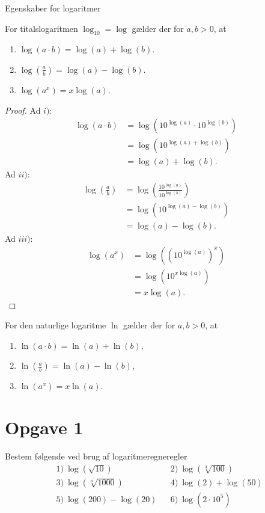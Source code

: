 \begin{center}
\Huge
Egenskaber for logaritmer
\end{center}

\begin{setn}
For titalslogaritmen $\log_{10} =\log$ gælder der for $a,b>0$, at 
\begin{enumerate}
\item $\log(a\cdot b) = \log(a) + \log(b)$. 
\item $\log\left(\frac{a}{b}\right) = \log(a)-\log(b)$.
\item $\log(a^x) = x\log(a)$.
\end{enumerate} 
\end{setn}
\begin{proof}
Ad $i)$:
\begin{align*}
\log(a\cdot b) &= \log(10^{\log(a)}\cdot 10^{\log(b)})\\
&= \log(10^{\log(a)+\log(b)})\\
&= \log(a)+\log(b).
\end{align*}
Ad $ii)$:
\begin{align*}
\log\left(\frac{a}{b}\right) &= \log \left(\frac{10^{\log(a)}}{10^{\log(b)}}\right)\\
&= \log(10^{\log(a)-\log(b)})\\
&= \log(a)-\log(b).
\end{align*}
Ad $iii)$:
\begin{align*}
\log(a^x) &= \log((10^{\log(a)})^x)\\
&= \log(10^{x\log(a)})\\
&= x\log(a).
\end{align*}
\end{proof}
\begin{setn}
For den naturlige logaritme $\ln$ gælder der for $a,b>0$, at
\begin{enumerate}[label=\roman*)]
\item $\ln(a\cdot b) = \ln(a) + \ln(b)$,
\item $\ln(\frac{a}{b}) = \ln(a)-\ln(b)$,
\item $\ln(a^x) = x\ln(a)$.
\end{enumerate}
\end{setn}


\section*{Opgave 1}
Bestem følgende ved brug af logaritmeregneregler
\begin{align*}
&1) \ \log(\sqrt{10})    &&2) \  \log(\sqrt[3]{100})  \\
&3) \ \log(\sqrt[n]{1000})   &&4) \ \log(2) + \log(50)    \\
&5) \ \log(200)-\log(20)   &&6) \ \log(2\cdot 10^5)   
\end{align*}

